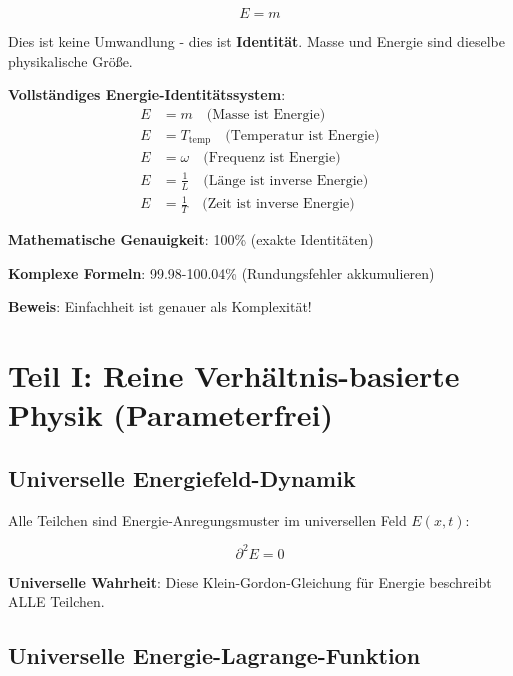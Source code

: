 \documentclass[12pt,a4paper]{article}
\newcommand{\Efield}{E}
\theoremstyle{definition}
\theoremstyle{remark}
\begin{document}
	\begin{equation}
		\boxed{E = m}
		\label{eq:energy_mass_identity}
	\end{equation}
	
	Dies ist keine Umwandlung - dies ist \textbf{Identität}. Masse und Energie sind dieselbe physikalische Größe.
	
	\begin{tcolorbox}[colback=blue!5!white,colframe=blue!75!black,title=Universelle Energie-Beziehungen]
		\textbf{Vollständiges Energie-Identitätssystem}:
		\begin{align}
			E &= m \quad \text{(Masse ist Energie)} \\
			E &= T_{\text{temp}} \quad \text{(Temperatur ist Energie)} \\
			E &= \omega \quad \text{(Frequenz ist Energie)} \\
			E &= \frac{1}{L} \quad \text{(Länge ist inverse Energie)} \\
			E &= \frac{1}{T} \quad \text{(Zeit ist inverse Energie)}
		\end{align}
		
		\textbf{Mathematische Genauigkeit}: 100\% (exakte Identitäten)
		
		\textbf{Komplexe Formeln}: 99.98-100.04\% (Rundungsfehler akkumulieren)
		
		\textbf{Beweis}: Einfachheit ist genauer als Komplexität!
	\end{tcolorbox}
	
	\section{Teil I: Reine Verhältnis-basierte Physik (Parameterfrei)}
	
	\subsection{Universelle Energiefeld-Dynamik}
	
	Alle Teilchen sind Energie-Anregungsmuster im universellen Feld $\Efield(x,t)$:
	
	\begin{equation}
		\boxed{\partial^2 \Efield = 0}
		\label{eq:universal_field_equation}
	\end{equation}
	
	\textbf{Universelle Wahrheit}: Diese Klein-Gordon-Gleichung für Energie beschreibt ALLE Teilchen.
	
	\subsection{Universelle Energie-Lagrange-Funktion}
	
\end{document}
